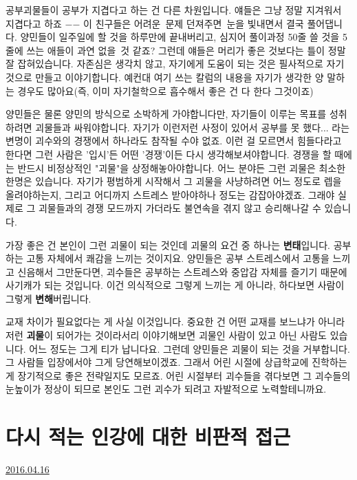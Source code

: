공부괴물들이 공부가 지겹다고 하는 건 다른 차원입니다. 얘들은 그냥 정말 지겨워서 지겹다고 하죠 $-$$-$
이 친구들은 어려운 문제 던져주면 눈을 빛내면서 결국 풀어댑니다.
양민들이 일주일에 할 것을 하루만에 끝내버리고, 심지어 풀이과정 50줄 쓸 것을 5줄에 쓰는 애들이 과연 없을 것 같죠?
그런데 얘들은 머리가 좋은 것보다는 틀이 정말 잘 잡혀있습니다.
자존심은 생각치 않고, 자기에게 도움이 되는 것은 필사적으로 자기 것으로 만들고 이야기합니다.
예컨대 여기 쓰는 칼럼의 내용을 자기가 생각한 양 말하는 경우도 많아요(즉, 이미 자기철학으로 흡수해서 좋은 건 다 한다 그것이죠)
\vspace{5mm}

양민들은 물론 양민의 방식으로 소박하게 가야합니다만, 자기들이 이루는 목표를 성취하려면 괴물들과 싸워야합니다.
자기가 이런저런 사정이 있어서 공부를 못 했다... 라는 변명이 괴수와의 경쟁에서 하나라도 참작될 수야 없죠.
이런 걸 모르면서 힘들다라고 한다면 그런 사람은 '입시'든 어떤 '경쟁'이든 다시 생각해보셔야합니다.
경쟁을 할 때에는 반드시 비정상적인 "괴물"을 상정해놓아야합니다. 어느 분야든 그런 괴물은 최소한 한명은 있습니다.
자기가 평범하게 시작해서 그 괴물을 사냥하려면 어느 정도로 렙을 올려야하는지, 그리고 어디까지 스트레스 받아야하나 정도는 감잡아야겠죠.
그래야 실제로 그 괴물들과의 경쟁 모드까지 가더라도 불연속을 겪지 않고 승리해나갈 수 있습니다.
\vspace{5mm}

가장 좋은 건 본인이 그런 괴물이 되는 것인데
괴물의 요건 중 하나는 \textbf{변태}입니다.
공부하는 고통 자체에서 쾌감을 느끼는 것이지요.
양민들은 공부 스트레스에서 고통을 느끼고 신음해서 그만둔다면,
괴수들은 공부하는 스트레스와 중압감 자체를 즐기기 때문에 사기캐가 되는 것입니다.
이건 의식적으로 그렇게 느끼는 게 아니라, 하다보면 사람이 그렇게 \textbf{변해}버립니다.
\vspace{5mm}

교재 차이가 필요없다는 게 사실 이것입니다. 중요한 건 어떤 교재를 보느냐가 아니라 저런 \textbf{괴물}이 되어가는 것이라서리
이야기해보면 괴물인 사람이 있고 아닌 사람도 있습니다. 어느 정도는 그게 티가 납니다요.
그런데 양민들은 괴물이 되는 것을 거부합니다. 그 사람들 입장에서야 그게 당연해보이겠죠.
그래서 어린 시절에 상급학교에 진학하는 게 장기적으로 좋은 전략일지도 모르죠. 어린 시절부터 괴수들을 겪다보면
그 괴수들의 눈높이가 정상이 되므로 본인도 그런 괴수가 되려고 자발적으로 노력할테니까요.
\vspace{5mm}






\section{다시 적는 인강에 대한 비판적 접근}
\href{https://www.kockoc.com/Apoc/732693}{2016.04.16}

